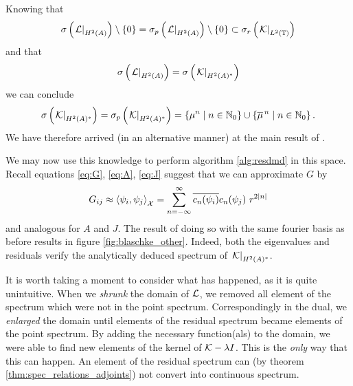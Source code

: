 Knowing that 
\begin{equation}
    \sigma \left( \left. \mathcal{L} \right|_{H^2 (A)} \right) \setminus \left\{ 0 \right\} = 
    \sigma_p \left( \left. \mathcal{L} \right|_{H^2 (A)} \right) \setminus \left\{ 0 \right\} \subset
    \sigma_r \left( \left. \mathcal{K} \right|_{L^2 (\mathbb{T})} \right)
\end{equation}
and that 
\begin{equation}
    \sigma \left( \left. \mathcal{L} \right|_{H^2 (A)} \right) = 
    \sigma \left( \left. \mathcal{K} \right|_{H^2 (A)^*} \right)
\end{equation}
we can conclude
\begin{equation}
    \sigma \left( \left. \mathcal{K} \right|_{H^2 (A)^*} \right) = 
    \sigma_p \left( \left. \mathcal{K} \right|_{H^2 (A)^*} \right) = 
    \left\{ \mu^n \mid n \in \mathbb{N}_0 \right\} \cup \left\{ \overline{\mu}^{\,n} \mid n \in \mathbb{N}_0 \right\} . 
\end{equation}
We have therefore arrived (in an alternative manner) at the main result of 
\cite{Slipantschuk2}. 

We may now use this knowledge to perform algorithm \ref{alg:resdmd} in this space. Recall 
equations \ref{eq:G}, \ref{eq:A}, \ref{eq:J} suggest that we can approximate 
$G$ by 
\begin{equation}
    G_{i j} \approx \left\langle \psi_i, \psi_j \right\rangle_\scrX
    = \sum_{n=-\infty}^{\infty} \overline{c_n (\psi_i)} c_n (\psi_j)\ r^{2 |n|} 
\end{equation}
and analogous for $A$ and $J$. The result of doing so with the same fourier basis 
as before results in figure \ref{fig:blaschke_other}. Indeed, both the eigenvalues and 
residuals verify the analytically deduced spectrum of $\left. \mathcal{K} \right|_{H^2 (A)^*}$. 

It is worth taking a moment to consider what has happened, as it is quite unintuitive. 
When we \emph{shrunk} the domain of $\mathcal{L}$, we removed all element of the spectrum which 
were not in the point spectrum. Correspondingly in the dual, we \emph{enlarged} the domain 
until elements of the residual spectrum became elements of the point spectrum. By adding 
the necessary function(als) to the domain, we were able to find new elements of the kernel 
of $\mathcal{K} - \lambda I$. This is the \emph{only} way that this can happen. An element of 
the residual spectrum can (by theorem \ref{thm:spec_relations_adjoints}) not convert into 
continuous spectrum. 

